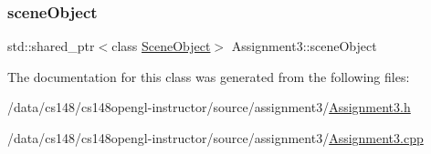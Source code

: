 \hypertarget{class_assignment3_a0bc175d3efff30c5f4aa3ffa1272338a}{}\label{class_assignment3_a0bc175d3efff30c5f4aa3ffa1272338a} 
\subsubsection{\texorpdfstring{scene\+Object}{sceneObject}}
{\footnotesize\ttfamily std\+::shared\+\_\+ptr$<$class \hyperlink{class_scene_object}{Scene\+Object}$>$ Assignment3\+::scene\+Object\hspace{0.3cm}{\ttfamily [private]}}



The documentation for this class was generated from the following files\+:\begin{DoxyCompactItemize}
\item 
/data/cs148/cs148opengl-\/instructor/source/assignment3/\hyperlink{_assignment3_8h}{Assignment3.\+h}\item 
/data/cs148/cs148opengl-\/instructor/source/assignment3/\hyperlink{_assignment3_8cpp}{Assignment3.\+cpp}\end{DoxyCompactItemize}
